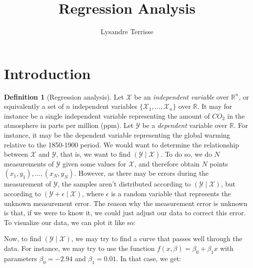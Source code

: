 \documentclass{article}
\title{Regression Analysis}
\author{Lysandre Terrisse}
\theoremstyle{definition}
\newtheorem{definition}{Definition}[section]
\theoremstyle{remark}
\theoremstyle{example}
\begin{document}
\maketitle

\section{Introduction}

\begin{definition}[Regression analysis]
		Let $\mathcal{X}$ be an \textit{independent variable} over $\mathbb{R}^n$, or equivalently a set of $n$ independent variables $\{\mathcal{X}_1, \dots, \mathcal{X}_n\}$ over $\mathbb{R}$. It may for instance be a single independent variable representing the amount of $CO_2$ in the atmosphere in parts per million (ppm). Let $\mathcal{Y}$ be a \textit{dependent} variable over $\mathbb{R}$. For instance, it may be the dependent variable representing the global warming relative to the 1850-1900 period. We would want to determine the relationship between $\mathcal{X}$ and $\mathcal{Y}$, that is, we want to find $(\mathcal{Y} \mid \mathcal{X})$. To do so, we do $N$ measurements of $\mathcal{Y}$ given some values for $\mathcal{X}$, and therefore obtain $N$ points $(x_1, y_1), \dots, (x_N, y_N)$. However, as there may be errors during the measurement of $\mathcal{Y}$, the samples aren't distributed according to $(\mathcal{Y} \mid \mathcal{X})$, but according to $(\mathcal{Y} + \epsilon \mid \mathcal{X})$, where $\epsilon$ is a random variable that represents the unknown measurement error. The reason why the measurement error is unknown is that, if we were to know it, we could just adjust our data to correct this error. To visualize our data, we can plot it like so:

\begin{figure}[h!]
		\centering
		\scalebox{0.9}{}
\end{figure}

		Now, to find $(\mathcal{Y} \mid \mathcal{X})$, we may try to find a curve that passes well through the data. For instance, we may try to use the function $f(x, \beta) = \beta_0 + \beta_1 x$ with parameters $\beta_0 = -2.94$ and $\beta_1 = 0.01$. In that case, we get:

\begin{figure}[h!]
		\centering
		\scalebox{0.9}{}
\end{figure}


\end{definition}
\end{document}
